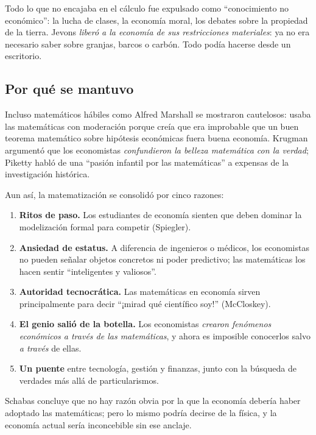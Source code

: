 \documentclass[a4paper,12pt]{article}
\begin{document}
Todo lo que no encajaba en el cálculo fue expulsado como ``conocimiento no económico'': la lucha de clases, la economía moral, los debates sobre la propiedad de la tierra. Jevons \textit{liberó a la economía de sus restricciones materiales}: ya no era necesario saber sobre granjas, barcos o carbón. Todo podía hacerse desde un escritorio.

\subsection*{Por qué se mantuvo}

Incluso matemáticos hábiles como Alfred Marshall se mostraron cautelosos: usaba las matemáticas con moderación porque creía que era improbable que un buen teorema matemático sobre hipótesis económicas fuera buena economía. Krugman argumentó que los economistas \textit{confundieron la belleza matemática con la verdad}; Piketty habló de una ``pasión infantil por las matemáticas'' a expensas de la investigación histórica.

Aun así, la matematización se consolidó por cinco razones:

\begin{enumerate}
  \item \textbf{Ritos de paso.} Los estudiantes de economía sienten que deben dominar la modelización formal para competir (Spiegler).
  \item \textbf{Ansiedad de estatus.} A diferencia de ingenieros o médicos, los economistas no pueden señalar objetos concretos ni poder predictivo; las matemáticas los hacen sentir ``inteligentes y valiosos''.
  \item \textbf{Autoridad tecnocrática.} Las matemáticas en economía sirven principalmente para decir ``¡mirad qué científico soy!'' (McCloskey).
  \item \textbf{El genio salió de la botella.} Los economistas \textit{crearon fenómenos económicos a través de las matemáticas}, y ahora es imposible conocerlos salvo \textit{a través} de ellas.
  \item \textbf{Un puente} entre tecnología, gestión y finanzas, junto con la búsqueda de verdades más allá de particularismos.
\end{enumerate}

\noindent Schabas concluye que no hay razón obvia por la que la economía debería haber adoptado las matemáticas; pero lo mismo podría decirse de la física, y la economía actual sería inconcebible sin ese anclaje.
\end{document}
